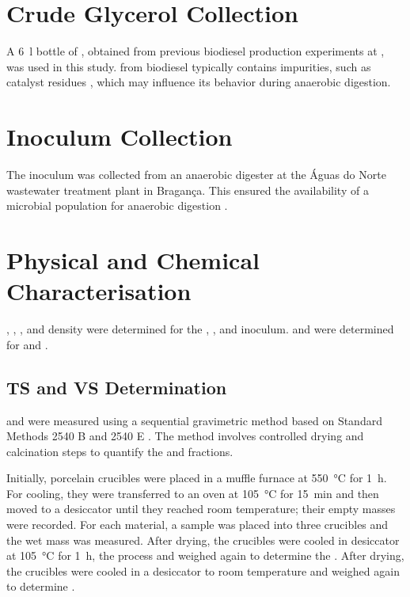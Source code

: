 \documentclass[12pt, a4paper, oneside]{report}
\begin{document}
\section{Crude Glycerol Collection}
\label{sec:gly_col}

A \qty{6}{\litre} bottle of , obtained from previous biodiesel production experiments at , was used in this study.  from biodiesel typically contains impurities, such as catalyst residues \parencite{attarbachi2023}, which may influence its behavior during anaerobic digestion.

\section{Inoculum Collection}
\label{sec:ino_col}

The inoculum was collected from an anaerobic digester at the Águas do Norte wastewater treatment plant in Bragança. This ensured the availability of a microbial population for anaerobic digestion \parencite{posmanik2020}.

\section{Physical and Chemical Characterisation}
\label{sec:phy_chem_char}

, , , and density were determined for the , , and inoculum.  and  were determined for  and .

\subsection{TS and VS Determination}
\label{subsec:ts_vs_determination}

 and  were measured using a sequential gravimetric method based on Standard Methods 2540 B and 2540 E \parencite{apha2023}. The method involves controlled drying and calcination steps to quantify the  and  fractions.

Initially, porcelain crucibles were placed in a muffle furnace at \qty{550}{\celsius} for \qty{1}{\hour}. For cooling, they were transferred to an oven at \qty{105}{\celsius} for \qty{15}{\minute} and then moved to a desiccator until they reached room temperature; their empty masses were recorded. For each material, a sample was placed into three crucibles and the wet mass was measured. After drying, the crucibles were cooled in desiccator at \qty{105}{\celsius} for \qty{1}{\hour}, the process and weighed again to determine the . After drying, the crucibles were cooled in a desiccator to room temperature and weighed again to determine .
\end{document}
